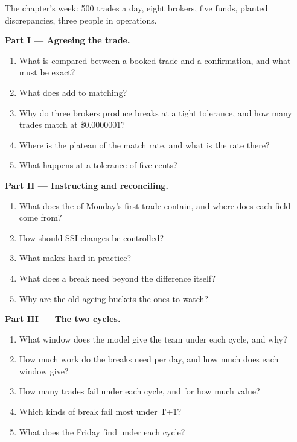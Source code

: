 \begin{problem}\label{pb:pl:post-trade-systems:1}
The chapter's week: 500 trades a day, eight brokers, five funds, planted discrepancies, three people in operations.

\medskip\noindent\textbf{Part I --- Agreeing the trade.}
\begin{enumerate}
\item What is compared between a booked trade and a confirmation, and what must be exact?
\item What does  add to matching?
\item Why do three brokers produce breaks at a tight tolerance, and how many trades match at \$0.0000001?
\item Where is the plateau of the match rate, and what is the rate there?
\item What happens at a tolerance of five cents?
\end{enumerate}

\medskip\noindent\textbf{Part II --- Instructing and reconciling.}
\begin{enumerate}[resume]
\item What does the  of Monday's first trade contain, and where does each field come from?
\item How should SSI changes be controlled?
\item What makes  hard in practice?
\item What does a break need beyond the difference itself?
\item Why are the old ageing buckets the ones to watch?
\end{enumerate}

\medskip\noindent\textbf{Part III --- The two cycles.}
\begin{enumerate}[resume]
\item What window does the model give the team under each cycle, and why?
\item How much work do the breaks need per day, and how much does each window give?
\item How many trades fail under each cycle, and for how much value?
\item Which kinds of break fail most under T+1?
\item What does the Friday  find under each cycle?
\end{enumerate}


\end{problem}
